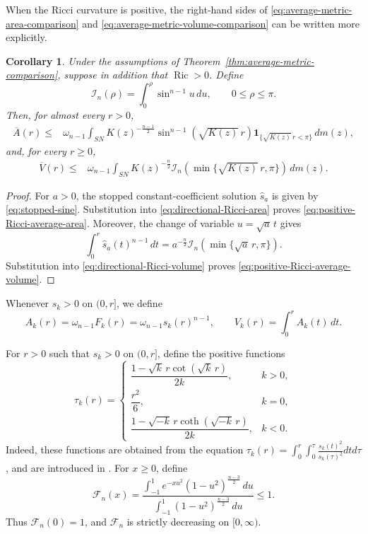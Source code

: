\documentclass[11pt, reqno]{amsart}
\newtheorem{corollary}{Corollary}
\begin{document}
When the Ricci curvature is positive, the right-hand sides of
\eqref{eq:average-metric-area-comparison} and
\eqref{eq:average-metric-volume-comparison} can be written more explicitly.

\begin{corollary}\label{cor:positive-Ricci-metric-comparison}
Under the assumptions of Theorem~\ref{thm:average-metric-comparison},
suppose in addition that $\operatorname{Ric}>0$. Define
$$
\mathcal I_n(\rho)=\int_0^\rho\sin^{n-1}u\, du,
\qquad 0\le \rho\le \pi.
$$
Then, for almost every $r>0$,
\begin{align}
\overline A(r)
\le {}&
\omega_{n-1}\int_{SN}
K(z)^{-\frac{n-1}{2}}
\sin^{n-1}\left(\sqrt{K(z)}\, r\right)
\mathbf 1_{\{\sqrt{K(z)}\, r<\pi\}}
\, dm(z),
\label{eq:positive-Ricci-average-area}
\end{align}
and, for every $r\ge 0$,
\begin{align}
\overline V(r)
\le {}&
\omega_{n-1}\int_{SN}
K(z)^{-\frac n2}
\mathcal I_n\left(\min\{\sqrt{K(z)}\, r, \pi\}\right)
\, dm(z).
\label{eq:positive-Ricci-average-volume}
\end{align}
\end{corollary}

\begin{proof}
For $a>0$, the stopped constant-coefficient solution $\widehat s_a$ is given by \eqref{eq:stopped-sine}.
Substitution into \eqref{eq:directional-Ricci-area} proves
\eqref{eq:positive-Ricci-average-area}. Moreover, the change of variable
$u=\sqrt a\, t$ gives
$$
\int_0^r\widehat s_a(t)^{n-1}\, dt
=
a^{-\frac n2}
\mathcal I_n\left(\min\{\sqrt a\, r, \pi\}\right).
$$
Substitution into \eqref{eq:directional-Ricci-volume} proves
\eqref{eq:positive-Ricci-average-volume}.
\end{proof}

Whenever $s_k>0$ on $(0, r]$, we define
$$
A_k(r)=\omega_{n-1}F_k(r)
=\omega_{n-1}s_k(r)^{n-1},
\qquad
V_k(r)=\int_0^r A_k(t)\, dt.
$$

For $r>0$ such that $s_k>0$ on $(0, r]$, define the positive functions
$$
\tau_k(r)
=
\begin{cases}
\dfrac{1-\sqrt{k}\, r\cot(\sqrt{k}\, r)}{2k},
& k>0, \\
\dfrac{r^2}{6},
& k=0, \\
\dfrac{1-\sqrt{-k}\, r\coth(\sqrt{-k}\, r)}{2k},
& k<0.
\end{cases}
$$
Indeed, these functions are obtained from the equation
$\tau_k(r)=\int_0^r \int_0^\tau \frac{s_k(t)^2}{s_k(\tau)^2} d t d \tau$, and are introduced in \cite{Kwong2025}.
For $x\ge 0$, define
\begin{equation*}\label{eq:definition-F-n}
\mathcal F_n(x)
=
\frac{
\displaystyle
\int_{-1}^1
e^{-xu^2}(1-u^2)^{\frac{n-3}{2}}\, du
}{
\displaystyle
\int_{-1}^1
(1-u^2)^{\frac{n-3}{2}}\, du
}\le1.
\end{equation*}
Thus $\mathcal F_n(0)=1$, and $\mathcal F_n$ is strictly decreasing on
$[0, \infty)$.
\end{document}
